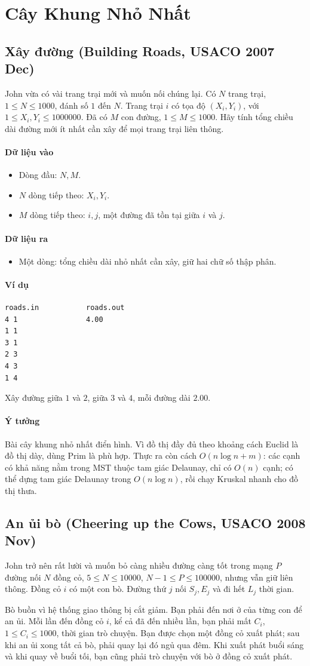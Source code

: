 \documentclass[11pt]{article}
\newcommand{\problem}[1]{\subsection{#1}}
\newcommand{\iosec}[1]{\paragraph{#1}}
\newcommand{\bigO}[1]{\ensuremath{O(#1)}}
\begin{document}
\section{Cây Khung Nhỏ Nhất}

\problem{Xây đường (Building Roads, USACO 2007 Dec)}

John vừa có vài trang trại mới và muốn nối chúng lại. Có \(N\) trang trại, \(1 \le N \le 1000\), đánh số \(1\) đến \(N\). Trang trại \(i\) có tọa độ \((X_i,Y_i)\), với \(1 \le X_i,Y_i \le 1000000\). Đã có \(M\) con đường, \(1 \le M \le 1000\). Hãy tính tổng chiều dài đường mới ít nhất cần xây để mọi trang trại liên thông.

\iosec{Dữ liệu vào}
\begin{itemize}
  \item Dòng đầu: \(N,M\).
  \item \(N\) dòng tiếp theo: \(X_i,Y_i\).
  \item \(M\) dòng tiếp theo: \(i,j\), một đường đã tồn tại giữa \(i\) và \(j\).
\end{itemize}

\iosec{Dữ liệu ra}
\begin{itemize}
  \item Một dòng: tổng chiều dài nhỏ nhất cần xây, giữ hai chữ số thập phân.
\end{itemize}

\iosec{Ví dụ}
\begin{verbatim}
roads.in           roads.out
4 1                4.00
1 1
3 1
2 3
4 3
1 4
\end{verbatim}

Xây đường giữa \(1\) và \(2\), giữa \(3\) và \(4\), mỗi đường dài \(2.00\).

\iosec{Ý tưởng}
Bài cây khung nhỏ nhất điển hình. Vì đồ thị đầy đủ theo khoảng cách Euclid là đồ thị dày, dùng Prim là phù hợp. Thực ra còn cách \(\bigO{n\log n+m}\): các cạnh có khả năng nằm trong MST thuộc tam giác Delaunay, chỉ có \(\bigO{n}\) cạnh; có thể dựng tam giác Delaunay trong \(\bigO{n\log n}\), rồi chạy Kruskal nhanh cho đồ thị thưa.

\problem{An ủi bò (Cheering up the Cows, USACO 2008 Nov)}

John trở nên rất lười và muốn bỏ càng nhiều đường càng tốt trong mạng \(P\) đường nối \(N\) đồng cỏ, \(5 \le N \le 10000\), \(N-1 \le P \le 100000\), nhưng vẫn giữ liên thông. Đồng cỏ \(i\) có một con bò. Đường thứ \(j\) nối \(S_j,E_j\) và đi hết \(L_j\) thời gian.

Bò buồn vì hệ thống giao thông bị cắt giảm. Bạn phải đến nơi ở của từng con để an ủi. Mỗi lần đến đồng cỏ \(i\), kể cả đã đến nhiều lần, bạn phải mất \(C_i\), \(1 \le C_i \le 1000\), thời gian trò chuyện. Bạn được chọn một đồng cỏ xuất phát; sau khi an ủi xong tất cả bò, phải quay lại đó ngủ qua đêm. Khi xuất phát buổi sáng và khi quay về buổi tối, bạn cũng phải trò chuyện với bò ở đồng cỏ xuất phát.
\end{document}
